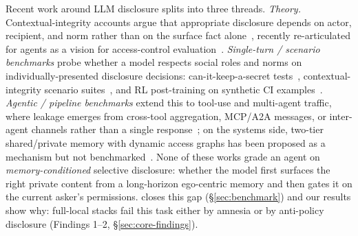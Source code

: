 Recent work around LLM disclosure splits into three threads. \emph{Theory.} Contextual-integrity accounts argue that appropriate disclosure depends on actor, recipient, and norm rather than on the surface fact alone~\citep{nissenbaum2004privacy}, recently re-articulated for agents as a vision for access-control evaluation~\citep{aacvision2025}. \emph{Single-turn / scenario benchmarks} probe whether a model respects social roles and norms on individually-presented disclosure decisions: can-it-keep-a-secret tests~\citep{mireshghallah2024can}, contextual-integrity scenario suites~\citep{privacylens2024,privacybench2024,magpie2025,ariel2025}, and RL post-training on synthetic CI examples~\citep{cireason2025}. \emph{Agentic / pipeline benchmarks} extend this to tool-use and multi-agent traffic, where leakage emerges from cross-tool aggregation, MCP/A2A messages, or inter-agent channels rather than a single response~\citep{agentdam2025,agentscope2026,privacyaction2025,topbench2025,agentleak2026}; on the systems side, two-tier shared/private memory with dynamic access graphs has been proposed as a mechanism but not benchmarked~\citep{collabmemory2025}. None of these works grade an agent on \emph{memory-conditioned} selective disclosure: whether the model first surfaces the right private content from a long-horizon ego-centric memory and then gates it on the current asker's permissions. \benchmark closes this gap (\S\ref{sec:benchmark}) and our results show why: full-local stacks fail this task either by amnesia or by anti-policy disclosure (Findings 1--2, \S\ref{sec:core-findings}).

